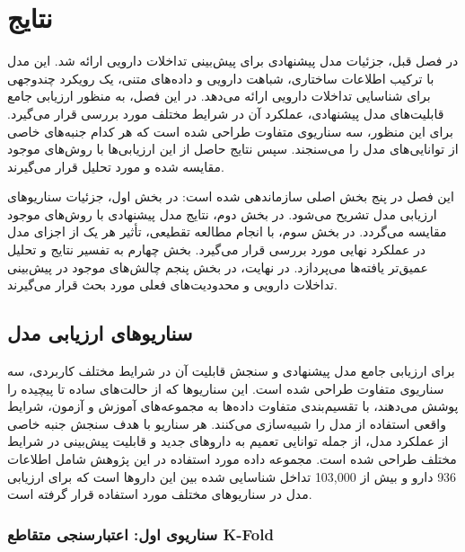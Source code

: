 \chapter{نتایج}
در فصل قبل، جزئیات مدل پیشنهادی برای پیش‌بینی تداخلات دارویی ارائه شد. این مدل با ترکیب اطلاعات ساختاری، شباهت دارویی و داده‌های متنی، یک رویکرد چندوجهی برای شناسایی تداخلات دارویی ارائه می‌دهد. در این فصل، به منظور ارزیابی جامع قابلیت‌های مدل پیشنهادی، عملکرد آن در شرایط مختلف مورد بررسی قرار می‌گیرد. برای این منظور، سه سناریوی متفاوت طراحی شده است که هر کدام جنبه‌های خاصی از توانایی‌های مدل را می‌سنجند. سپس نتایج حاصل از این ارزیابی‌ها با روش‌های موجود مقایسه شده و مورد تحلیل قرار می‌گیرند.

این فصل در پنج بخش اصلی سازماندهی شده است: در بخش اول، جزئیات سناریوهای ارزیابی مدل تشریح می‌شود. در بخش دوم، نتایج مدل پیشنهادی با روش‌های موجود مقایسه می‌گردد. در بخش سوم، با انجام مطالعه تقطیعی، تأثیر هر یک از اجزای مدل در عملکرد نهایی مورد بررسی قرار می‌گیرد. بخش چهارم به تفسیر نتایج و تحلیل عمیق‌تر یافته‌ها می‌پردازد. در نهایت، در بخش پنجم چالش‌های موجود در پیش‌بینی تداخلات دارویی و محدودیت‌های فعلی مورد بحث قرار می‌گیرند.

\section{سناریوهای ارزیابی مدل}

برای ارزیابی جامع مدل پیشنهادی و سنجش قابلیت آن در شرایط مختلف کاربردی، سه سناریوی متفاوت طراحی شده است. این سناریوها که از حالت‌های ساده تا پیچیده را پوشش می‌دهند، با تقسیم‌بندی متفاوت داده‌ها به مجموعه‌های آموزش و آزمون، شرایط واقعی استفاده از مدل را شبیه‌سازی می‌کنند. هر سناریو با هدف سنجش جنبه خاصی از عملکرد مدل، از جمله توانایی تعمیم به داروهای جدید و قابلیت پیش‌بینی در شرایط مختلف طراحی شده است. مجموعه داده مورد استفاده در این پژوهش شامل اطلاعات 936 دارو و بیش از 103,000 تداخل شناسایی شده بین این داروها است که برای ارزیابی مدل در سناریوهای مختلف مورد استفاده قرار گرفته است.


\subsection{سناریوی اول: اعتبارسنجی متقاطع K-Fold}

